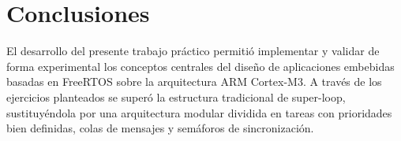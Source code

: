 \chapter{Conclusiones}

El desarrollo del presente trabajo práctico permitió implementar y validar de forma experimental los conceptos
centrales del diseño de aplicaciones embebidas basadas en FreeRTOS sobre la arquitectura ARM Cortex-M3. A través
de los ejercicios planteados se superó la estructura tradicional de super-loop, sustituyéndola por una arquitectura
modular dividida en tareas con prioridades bien definidas, colas de mensajes y semáforos de sincronización.

